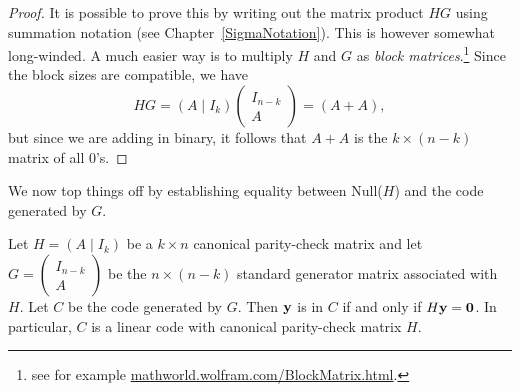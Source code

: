 \begin{proof}
It is possible to prove this by writing out the matrix product $HG$ using summation notation (see Chapter~\ref{SigmaNotation}). This is however somewhat long-winded. A much easier way is to multiply $H$ and $G$ as \emph{block matrices}.\footnote{see for example \url{mathworld.wolfram.com/BlockMatrix.html}.} Since the block sizes are compatible, we have
\[ HG = (A \mid I_k )\left(
 \begin{array}{c}
 I_{n-k} \\
A
 \end{array} \right) = (A + A),\]
but since we are adding in binary, it follows that $A + A$ is the $k \times (n-k)$ matrix of all 0's.
\end{proof}
 
 We now top things off by establishing equality between Null($H$) and the code generated by $G$.
  
 \begin{prop}{}
Let $H = (A \mid I_k )$ be a $k \times n$ canonical parity-check
matrix and let $G = \left(
\begin{array}{c}
I_{n-k} \\
A
\end{array}  \right) $ be the $n
\times (n-k)$ standard generator matrix associated with $H$. Let $C$
be the code generated by $G$. Then ${\bold y}$ is in $C$ if and only
if $H {\bold y} = {\bold 0}$. In particular, $C$ is a linear code with
canonical parity-check matrix $H$. 
\end{prop}
 
